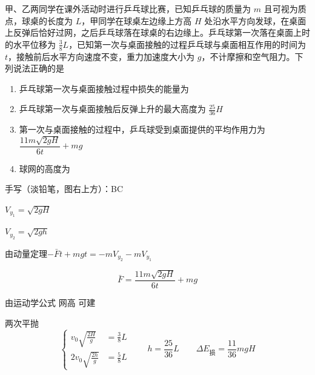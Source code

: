 \begin{problem}
甲、乙两同学在课外活动时进行乒乓球比赛，已知乒乓球的质量为 $m$ 且可视为质点，球桌的长度为 $L$，甲同学在球桌左边缘上方高 $H$ 处沿水平方向发球，在桌面上反弹后恰好过网，之后乒乓球落在球桌的右边缘上。乒乓球第一次落在桌面上时的水平位移为 $\frac{3}{8}L$，已知第一次与桌面接触的过程乒乓球与桌面相互作用的时间为 $t$，接触前后水平方向速度不变，重力加速度大小为 $g$，不计摩擦和空气阻力。下列说法正确的是
\begin{enumerate}[label=\Alph*.,leftmargin=2em,itemsep=0pt]
\item 乒乓球第一次与桌面接触过程中损失的能量为  %
\item 乒乓球第一次与桌面接触后反弹上升的最大高度为 $\frac{25}{36}H$
\item 第一次与桌面接触的过程中，乒乓球受到桌面提供的平均作用力为 $\dfrac{11m\sqrt{2gH}}{6t}+mg$
\item 球网的高度为  %
\end{enumerate}
手写（淡铅笔，图右上方）：BC
\begin{solution}
$V_{y_1}=\sqrt{2gH}$

$V_{y_2}=\sqrt{2gh}$

由动量定理\quad $-\bar{F}t+mgt=-mV_{y_2}-mV_{y_1}$

\[
\bar{F}=\frac{11m\sqrt{2gH}}{6t}+mg
\]

由运动学公式 网高 可建

两次平抛
\[
\left\{\begin{aligned}
v_0\sqrt{\frac{2H}{g}}&=\frac{3}{8}L\\
2v_0\sqrt{\frac{2h}{g}}&=\frac{5}{8}L
\end{aligned}\right.
\qquad h=\frac{25}{36}L\qquad \Delta E_{\text{损}}=\frac{11}{36}mgH
\]
\end{solution}
\end{problem}
